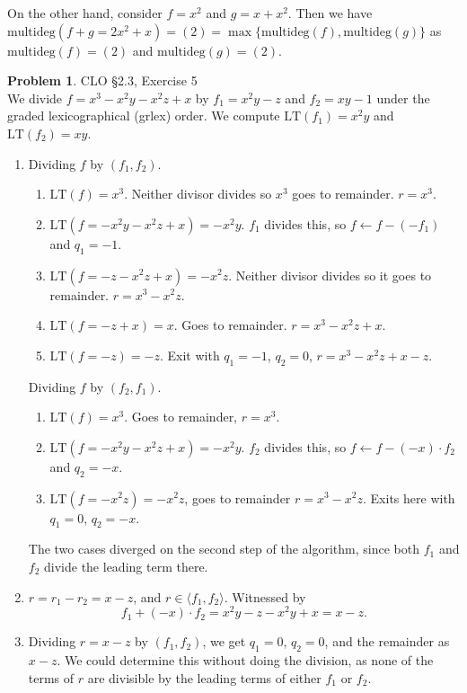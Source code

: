 \documentclass[12pt]{amsart}
\theoremstyle{definition}
\newtheorem{prob}{Problem}
\begin{document}
\begin{flushleft}
\begin{enumerate}
    On the other hand, consider $f=x^2$ and $g =x+x^2$. Then we have $\text{multideg}(f+g=2x^2+x) = (2)=\max\{\text{multideg}(f),\text{multideg}(g)\}$ as $\text{multideg}(f)=(2)$ and $\text{multideg}(g)=(2)$.
\end{enumerate}
\begin{prob} CLO \S2.3, Exercise 5\smallskip \\
We divide $f=x^3-x^2y-x^2z+x$ by $f_1=x^2y-z$ and $f_2=xy-1$ under the graded lexicographical (grlex) order. We compute $\text{LT}(f_1)=x^2y$ and $\text{LT}(f_2) = xy$.
\begin{enumerate}
    \item[a.] Dividing $f$ by $(f_1,f_2)$. \begin{enumerate}
        \item[1.] $\text{LT}(f)=x^3$. Neither divisor divides so $x^3$ goes to remainder. $r=x^3$.
        \item[2.] $\text{LT}(f=-x^2y-x^2z+x)=-x^2y$. $f_1$ divides this, so $f\leftarrow f- (-f_1)$ and $q_1 = -1$.
        \item[3.] $\text{LT}(f=-z-x^2z+x)=-x^2z$. Neither divisor divides so it goes to remainder. $r=x^3 -x^2z$.
        \item[4.] $\text{LT}(f=-z+x)=x$. Goes to remainder. $r=x^3-x^2z+x$.
        \item[5.] $\text{LT}(f=-z)=-z$. Exit with $q_1=-1$, $q_2=0$, $r=x^3-x^2z+x-z$.
    \end{enumerate}
    Dividing $f$ by $(f_2, f_1)$.
    \begin{enumerate}
        \item[1.] $\text{LT}(f)=x^3$. Goes to remainder, $r=x^3$. 
        \item[2.] $\text{LT}(f=-x^2y-x^2z+x)=-x^2y$. $f_2$ divides this, so $f\leftarrow f- (-x)\cdot f_2$ and $q_2 = -x$.
        \item[3.] $\text{LT}(f=-x^2z)=-x^2z$, goes to remainder $r = x^3 - x^2 z$. Exits here with $q_1=0$, $q_2 = -x$.
    \end{enumerate}
    The two cases diverged on the second step of the algorithm, since both $f_1$ and $f_2$ divide the leading term there.
    \item[b.] $r=r_1-r_2 = x-z$, and $r \in \langle f_1,f_2\rangle$. Witnessed by \[f_1 +(-x)\cdot f_2 = x^2y-z-x^2y+x=x-z.\]
    \item[c.] Dividing $r=x-z$ by $(f_1,f_2)$, we get $q_1=0$, $q_2 = 0$, and the remainder as $x-z$. We could determine this without doing the division, as none of the terms of $r$ are divisible by the leading terms of either $f_1$ or $f_2$.

\end{enumerate}
\end{prob}
\end{flushleft}
\end{document}
